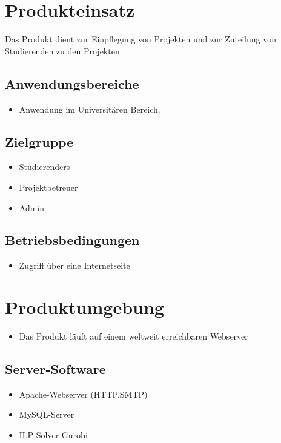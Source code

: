 \documentclass[parskip=full]{scrartcl}
\begin{document}
\section{Produkteinsatz}
Das Produkt dient zur Einpflegung von Projekten und zur Zuteilung von
Studierenden zu den Projekten.


\subsection{Anwendungsbereiche}

\begin{itemize} 
  \item Anwendung im Universitären Bereich. %
\end{itemize}

\subsection{Zielgruppe}
\begin{itemize} 
  \item \glspl{Studierender}
  \item \gls{Projektbetreuer}
  \item \gls{Admin}
\end{itemize}

\subsection{Betriebsbedingungen}
\begin{itemize} 
  \item Zugriff über eine Internetseite
\end{itemize}
\section{Produktumgebung}
\begin{itemize} 
  \item Das Produkt läuft auf einem weltweit erreichbaren Webserver
\end{itemize}
\subsection{Server-Software}
\begin{itemize} 
  \item Apache-Webserver (HTTP,SMTP)
  \item MySQL-Server
  \item ILP-Solver Gurobi %
\end{itemize}
\end{document}
